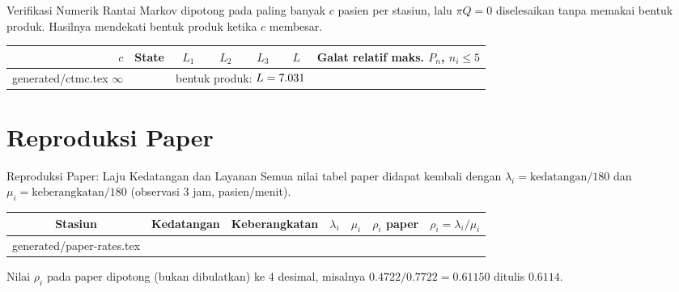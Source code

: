 \documentclass[aspectratio=169]{beamer}
\makeatletter
\newcommand{\tablerows}[1]{\@@input generated/#1.tex }
\makeatother
\begin{document}
\begin{frame}{Verifikasi Numerik}
    Rantai Markov dipotong pada paling banyak $c$ pasien per stasiun, lalu $\pi Q = 0$ diselesaikan tanpa memakai bentuk produk. Hasilnya mendekati bentuk produk ketika $c$ membesar.
    \begin{table}
        \small
        \begin{tabular}{rrccccc}
            \toprule
            $c$ & State & $L_1$ & $L_2$ & $L_3$ & $L$ & Galat relatif maks. $P_{n}$, $n_i \le 5$ \\
            \midrule
            \tablerows{ctmc}
            \midrule
            $\infty$ & & \multicolumn{4}{c}{bentuk produk: $L = 7.031$} & \\
            \bottomrule
        \end{tabular}
    \end{table}
\end{frame}


\section{\color{mygreen}\huge Reproduksi Paper}
\begin{frame}{Reproduksi Paper: Laju Kedatangan dan Layanan}
    Semua nilai tabel paper didapat kembali dengan $\lambda_i = \text{kedatangan}/180$ dan $\mu_i = \text{keberangkatan}/180$ (observasi 3 jam, pasien/menit).
    \begin{table}
        \small
        \begin{tabular}{ccccccc}
            \toprule
            Stasiun & Kedatangan & Keberangkatan & $\lambda_i$ & $\mu_i$ & $\rho_i$ paper & $\rho_i = \lambda_i/\mu_i$ \\
            \midrule
            \tablerows{paper-rates}
            \bottomrule
        \end{tabular}
    \end{table}
    \footnotesize Nilai $\rho_i$ pada paper dipotong (bukan dibulatkan) ke 4 desimal, misalnya $0.4722/0.7722 = 0.61150$ ditulis $0.6114$.
\end{frame}
\end{document}
